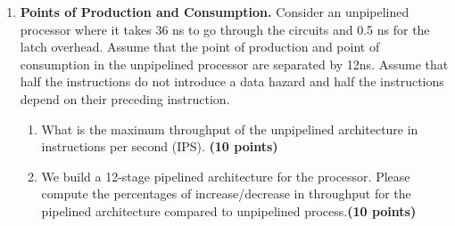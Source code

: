 \documentclass[a4paper, 11pt]{exam}
\begin{document}
\begin{center}
{{{\begin{enumerate}
\begin{enumerate}
\begin {center}
Load F2, 28(R5)

MUL F0, F2, F4

SUB F8, F6, F3

DIV F10, F0, F6

ADD F6, F8, F2

Store F8, 50(R5)

\end {center}

\item Create a timing diagram for the code showing the execution of the code in time (clock cycles). \textbf{(20 points)}


\end{enumerate}
Note:  Assumptions to solve the question:
%
\begin{itemize}
	\item To avoid imprecise exception, keep the WB in order.
	\item  Register file has 2 read and one write ports; a write and up to two read can happen at the same time for different locations but NOT for the same location.
\end{itemize}



\item \textbf{Points of Production and Consumption.}
Consider an unpipelined processor where it takes 36 ns to go through the circuits and 0.5 ns for the latch overhead. Assume that the point of production and point of consumption in the unpipelined processor are separated by 12ns. Assume that half the instructions do not introduce a data hazard and half the instructions depend on their preceding instruction.

\begin{enumerate}
\item What is the maximum throughput of the unpipelined architecture in instructions per second (IPS). \textbf{(10 points)}


\item We build a 12-stage pipelined architecture for the processor. Please compute the percentages of increase/decrease in throughput for the pipelined architecture compared to unpipelined process.\textbf {(10 points)}




\end{enumerate}
\end{enumerate}}}}
\end{center}
\end{document}
